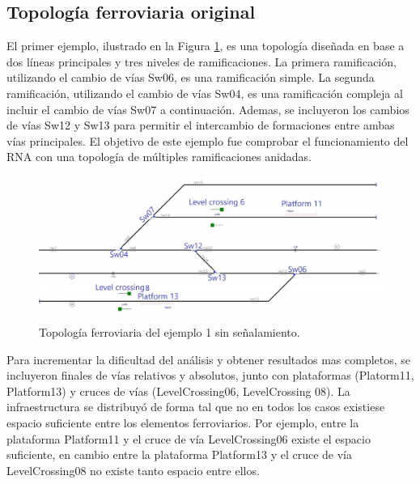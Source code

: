 \subsection{Topología ferroviaria original}

	El primer ejemplo, ilustrado en la Figura \ref{fig:EJ1_1}, es una topología diseñada en base a dos líneas principales y tres niveles de ramificaciones. La primera ramificación, utilizando el cambio de vías Sw06, es una ramificación simple. La segunda ramificación, utilizando el cambio de vías Sw04, es una ramificación compleja al incluir el cambio de vías Sw07 a continuación. Ademas, se incluyeron los cambios de vías Sw12 y Sw13 para permitir el intercambio de formaciones entre ambas vías principales. El objetivo de este ejemplo fue comprobar el funcionamiento del RNA con una topología de múltiples ramificaciones anidadas.
	
	\begin{figure}[h]
		\centering
		\includegraphics[width=1\textwidth]{resultados-obtenidos/ejemplo1/images/1_empty.png}
		\centering\caption{Topología ferroviaria del ejemplo 1 sin señalamiento.}
		\label{fig:EJ1_1}
	\end{figure}
	
	Para incrementar la dificultad del análisis y obtener resultados mas completos, se incluyeron finales de vías relativos y absolutos, junto con plataformas (Platorm11, Platform13) y cruces de vías (LevelCrossing06, LevelCrossing 08). La infraestructura se distribuyó de forma tal que no en todos los casos existiese espacio suficiente entre los elementos ferroviarios. Por ejemplo, entre la plataforma Platform11 y el cruce de vía LevelCrossing06 existe el espacio suficiente, en cambio entre la plataforma Platform13 y el cruce de vía LevelCrossing08 no existe tanto espacio entre ellos.